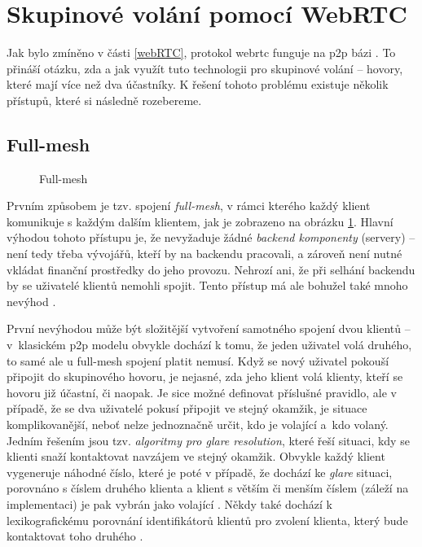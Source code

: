 \section{Skupinové volání pomocí WebRTC}\label{connectionModels}

Jak bylo zmíněno v části \ref{webRTC}, protokol \gls{webrtc} funguje na
\gls{p2p} bázi \parencite{WebRTCORG-PeerConnections}. To přináší otázku, zda a
jak využít tuto technologii pro skupinové volání -- hovory, které mají více než
dva účastníky. K řešení tohoto problému existuje několik přístupů, které si
následně rozebereme.

\subsection{Full-mesh}

\begin{figure}[H]
    \centering
    \caption{Full-mesh}
    \label{fullMeshFig}
\end{figure}

Prvním způsobem je tzv. spojení \textit{full-mesh}, v rámci kterého každý klient
komunikuje s každým dalším klientem, jak je zobrazeno na obrázku
\ref{fullMeshFig}. Hlavní výhodou tohoto přístupu je, že nevyžaduje žádné
\textit{backend komponenty} (servery) -- není tedy třeba vývojářů, kteří by na
backendu pracovali, a zároveň není nutné vkládat finanční prostředky do jeho
provozu. Nehrozí ani, že při selhání backendu by se uživatelé klientů nemohli
spojit. Tento přístup má ale bohužel také mnoho nevýhod
\parencite{HalOpenScience-SFUs}.

První nevýhodou může být složitější vytvoření samotného spojení dvou klientů --
v~klasickém \gls{p2p} modelu obvykle dochází k tomu, že jeden uživatel volá
druhého, to samé ale u full-mesh spojení platit nemusí. Když se nový uživatel
pokouší připojit do skupinového hovoru, je nejasné, zda jeho klient volá
klienty, kteří se hovoru již účastní, či naopak. Je sice možné definovat
příslušné pravidlo, ale v případě, že se dva uživatelé pokusí připojit ve stejný
okamžik, je situace komplikovanější, neboť nelze jednoznačně určit, kdo je
volající a~kdo volaný. Jedním řešením jsou tzv. \textit{algoritmy pro glare
    resolution}, které řeší situaci, kdy se klienti snaží kontaktovat navzájem ve
stejný okamžik. Obvykle každý klient vygeneruje náhodné číslo, které je poté v
případě, že dochází ke \textit{glare} situaci, porovnáno s číslem druhého
klienta a klient s větším či menším číslem (záleží na implementaci) je pak
vybrán jako volající \parencite{MagnusWesterlund-GlareInWebRTC}. Někdy také
dochází k lexikografickému porovnání identifikátorů klientů pro zvolení klienta,
který bude kontaktovat toho druhého \parencite{GitHub-MSC3401}.


